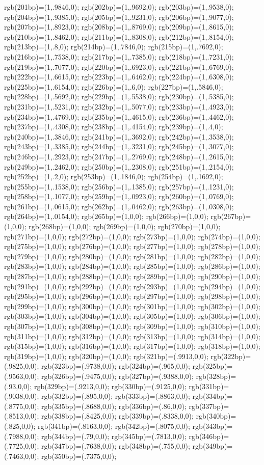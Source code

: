 {{{rgb(201bp)=(1,.9846,0); rgb(202bp)=(1,.9692,0); rgb(203bp)=(1,.9538,0); rgb(204bp)=(1,.9385,0); rgb(205bp)=(1,.9231,0); rgb(206bp)=(1,.9077,0); rgb(207bp)=(1,.8923,0); rgb(208bp)=(1,.8769,0); rgb(209bp)=(1,.8615,0); rgb(210bp)=(1,.8462,0); rgb(211bp)=(1,.8308,0); rgb(212bp)=(1,.8154,0); rgb(213bp)=(1,.8,0); rgb(214bp)=(1,.7846,0); rgb(215bp)=(1,.7692,0); rgb(216bp)=(1,.7538,0); rgb(217bp)=(1,.7385,0); rgb(218bp)=(1,.7231,0); rgb(219bp)=(1,.7077,0); rgb(220bp)=(1,.6923,0); rgb(221bp)=(1,.6769,0); rgb(222bp)=(1,.6615,0); rgb(223bp)=(1,.6462,0); rgb(224bp)=(1,.6308,0); rgb(225bp)=(1,.6154,0); rgb(226bp)=(1,.6,0); rgb(227bp)=(1,.5846,0); rgb(228bp)=(1,.5692,0); rgb(229bp)=(1,.5538,0); rgb(230bp)=(1,.5385,0); rgb(231bp)=(1,.5231,0); rgb(232bp)=(1,.5077,0); rgb(233bp)=(1,.4923,0); rgb(234bp)=(1,.4769,0); rgb(235bp)=(1,.4615,0); rgb(236bp)=(1,.4462,0); rgb(237bp)=(1,.4308,0); rgb(238bp)=(1,.4154,0); rgb(239bp)=(1,.4,0); rgb(240bp)=(1,.3846,0); rgb(241bp)=(1,.3692,0); rgb(242bp)=(1,.3538,0); rgb(243bp)=(1,.3385,0); rgb(244bp)=(1,.3231,0); rgb(245bp)=(1,.3077,0); rgb(246bp)=(1,.2923,0); rgb(247bp)=(1,.2769,0); rgb(248bp)=(1,.2615,0); rgb(249bp)=(1,.2462,0); rgb(250bp)=(1,.2308,0); %
rgb(251bp)=(1,.2154,0); rgb(252bp)=(1,.2,0); rgb(253bp)=(1,.1846,0); rgb(254bp)=(1,.1692,0); rgb(255bp)=(1,.1538,0); rgb(256bp)=(1,.1385,0); rgb(257bp)=(1,.1231,0); rgb(258bp)=(1,.1077,0); rgb(259bp)=(1,.0923,0); rgb(260bp)=(1,.0769,0); rgb(261bp)=(1,.0615,0); rgb(262bp)=(1,.0462,0); rgb(263bp)=(1,.0308,0); rgb(264bp)=(1,.0154,0); rgb(265bp)=(1,0,0); rgb(266bp)=(1,0,0); rgb(267bp)=(1,0,0); rgb(268bp)=(1,0,0); rgb(269bp)=(1,0,0); rgb(270bp)=(1,0,0); rgb(271bp)=(1,0,0); rgb(272bp)=(1,0,0); rgb(273bp)=(1,0,0); rgb(274bp)=(1,0,0); rgb(275bp)=(1,0,0); rgb(276bp)=(1,0,0); rgb(277bp)=(1,0,0); rgb(278bp)=(1,0,0); rgb(279bp)=(1,0,0); rgb(280bp)=(1,0,0); rgb(281bp)=(1,0,0); rgb(282bp)=(1,0,0); rgb(283bp)=(1,0,0); rgb(284bp)=(1,0,0); rgb(285bp)=(1,0,0); rgb(286bp)=(1,0,0); rgb(287bp)=(1,0,0); rgb(288bp)=(1,0,0); rgb(289bp)=(1,0,0); rgb(290bp)=(1,0,0); rgb(291bp)=(1,0,0); rgb(292bp)=(1,0,0); rgb(293bp)=(1,0,0); rgb(294bp)=(1,0,0); rgb(295bp)=(1,0,0); rgb(296bp)=(1,0,0); rgb(297bp)=(1,0,0); rgb(298bp)=(1,0,0); rgb(299bp)=(1,0,0); rgb(300bp)=(1,0,0); %
rgb(301bp)=(1,0,0); rgb(302bp)=(1,0,0); rgb(303bp)=(1,0,0); rgb(304bp)=(1,0,0); rgb(305bp)=(1,0,0); rgb(306bp)=(1,0,0); rgb(307bp)=(1,0,0); rgb(308bp)=(1,0,0); rgb(309bp)=(1,0,0); rgb(310bp)=(1,0,0); rgb(311bp)=(1,0,0); rgb(312bp)=(1,0,0); rgb(313bp)=(1,0,0); rgb(314bp)=(1,0,0); rgb(315bp)=(1,0,0); rgb(316bp)=(1,0,0); rgb(317bp)=(1,0,0); rgb(318bp)=(1,0,0); rgb(319bp)=(1,0,0); rgb(320bp)=(1,0,0); rgb(321bp)=(.9913,0,0); rgb(322bp)=(.9825,0,0); rgb(323bp)=(.9738,0,0); rgb(324bp)=(.965,0,0); rgb(325bp)=(.9563,0,0); rgb(326bp)=(.9475,0,0); rgb(327bp)=(.9388,0,0); rgb(328bp)=(.93,0,0); rgb(329bp)=(.9213,0,0); rgb(330bp)=(.9125,0,0); rgb(331bp)=(.9038,0,0); rgb(332bp)=(.895,0,0); rgb(333bp)=(.8863,0,0); rgb(334bp)=(.8775,0,0); rgb(335bp)=(.8688,0,0); rgb(336bp)=(.86,0,0); rgb(337bp)=(.8513,0,0); rgb(338bp)=(.8425,0,0); rgb(339bp)=(.8338,0,0); rgb(340bp)=(.825,0,0); rgb(341bp)=(.8163,0,0); rgb(342bp)=(.8075,0,0); rgb(343bp)=(.7988,0,0); rgb(344bp)=(.79,0,0); rgb(345bp)=(.7813,0,0); rgb(346bp)=(.7725,0,0); rgb(347bp)=(.7638,0,0); rgb(348bp)=(.755,0,0); rgb(349bp)=(.7463,0,0); rgb(350bp)=(.7375,0,0); %
}}}
